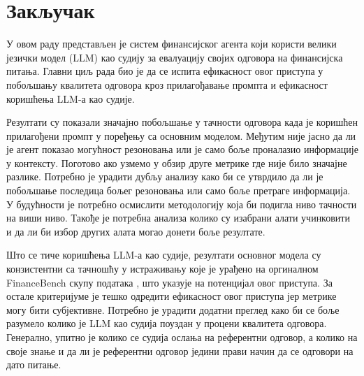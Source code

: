 \chapter{Закључак}

У овом раду представљен је систем финансијског агента који користи велики језички модел (LLM) као судију за евалуацију својих одговора на финансијска питања. Главни циљ рада био је да се испита ефикасност овог приступа у побољшању квалитета одговора кроз прилагођавање промпта и ефикасност коришћења LLM-а као судије.
\newline

Резултати су показали значајно побољшање у тачности одговора када је коришћен прилагођени промпт у поређењу са основним моделом. Међутим није јасно да ли је агент показао могућност резоновања или је само боље проналазио информације у контексту. Поготово ако узмемо у обзир друге метрике где није било значајне разлике. Потребно је урадити дубљу анализу како би се утврдило да ли је побољшање последица бољег резоновања или само боље претраге информација. У будућности је потребно осмислити методологију која би подигла ниво тачности на виши ниво. Такође је потребна анализа колико су изабрани алати учинковити и да ли би избор других алата могао донети боље резултате.
\newline

Што се тиче коришћења LLM-а као судије, резултати основног модела су конзистентни са тачношћу  у истраживању које је урађено на оргиналном FinanceBench скупу података \cite{yang_evaluating_2025}, што указује на потенцијал овог приступа. За остале критеријуме је тешко одредити ефикасност овог приступа јер метрике могу бити субјективне. Потребно је урадити додатни преглед како би се боље разумело колико је LLM као судија поуздан у процени квалитета одговора. Генерално, упитно је колико се судија ослања на референтни одговор, а колико на своје знање и да ли је референтни одговор једини прави начин да се одговори на дато питање.
\newline



